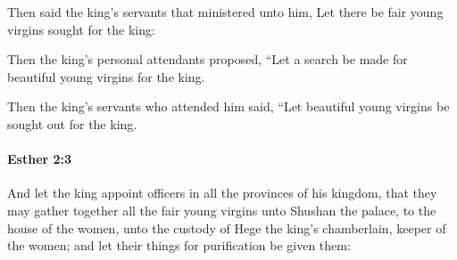 			\begin{versebox}
					\item[BHS] 
					\item[LXX] 
					\item[ASV] Then said the king's servants that ministered unto him, Let there be fair young virgins sought for the king:
					\item[NIV] Then the king’s personal attendants proposed, “Let a search be made for beautiful young virgins for the king.
					\item[NRSV] Then the king’s servants who attended him said, “Let beautiful young virgins be sought out for the king.
			\end{versebox}

		\paragraph{Esther 2:3} %
			\label{ESTHER-2-3}

			And let the king appoint officers in all the provinces of his kingdom, that they may gather together all the fair young virgins unto Shushan the palace, to the house of the women, unto the custody of Hege the king’s chamberlain, keeper of the women; and let their things for purification be given them:

